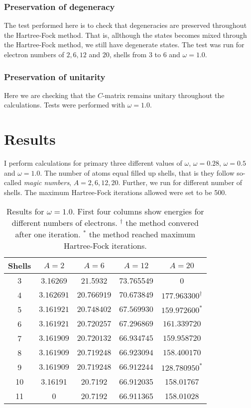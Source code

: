 \documentclass[11pt]{article}
\begin{document}
\subsubsection{Preservation of degeneracy}
The test performed here is to check that degeneracies are preserved throughout the Hartree-Fock method. That is, allthough the states becomes mixed through the Hartree-Fock method, we still have degenerate states. The test was run for electron numbers of $2,6,12$ and $20$, shells from $3$ to $6$ and $\omega=1.0$.

\subsubsection{Preservation of unitarity}
Here we are checking that the $C$-matrix remains unitary throughout the calculations. Tests were performed with $\omega = 1.0$.

\section{Results}
I perform calculations for primary three different values of $\omega$, $\omega=0.28$, $\omega=0.5$ and $\omega=1.0$. The number of atoms equal filled up shells, that is they follow so-called \textit{magic numbers}, $A = 2, 6, 12, 20$. Further, we run for different number of shells. The maximum Hartree-Fock iterations allowed were set to be 500.

\begin{table}[H]
	\centering
	\caption{Results for $\omega = 1.0$. First four columns show energies for different numbers of electrons. $^\dagger$ the method convered after one iteration. $^*$ the method reached maximum Hartree-Fock iterations.}
	\begin{tabular}{c c c c c}
		\\ \hline \hline
		Shells 	& $A = 2$	& $A = 6$ 	& $A = 12$ 	& $A = 20$ 	\\ \hline
         3 &    3.16269 &    21.5932 &  73.765549 &          0  \\ 
         4 & $  3.162691$ & $ 20.766919$ & $ 70.673849$ & $177.963300^\dagger$  \\ 
         5 & $  3.161921$ & $ 20.748402$ & $ 67.569930$ & $159.972600^*$  \\ 
         6 & $  3.161921$ & $ 20.720257$ & $ 67.296869$ & $161.339720$  \\ 
         7 & $  3.161909$ & $ 20.720132$ & $ 66.934745$ & $159.958720$  \\ 
         8 & $  3.161909$ & $ 20.719248$ & $ 66.923094$ & $158.400170$  \\ 
         9 & $  3.161909$ & $ 20.719248$ & $ 66.912244$ & $128.780950^*$  \\ 
        10 &    3.16191 &    20.7192 &  66.912035 &  158.01767  \\ 
        11 &          0 &    20.7192 &  66.911365 &  158.01028  \\ 
        \hline \hline
	\end{tabular}
	\label{tab:omega10}
\end{table}
\end{document}
